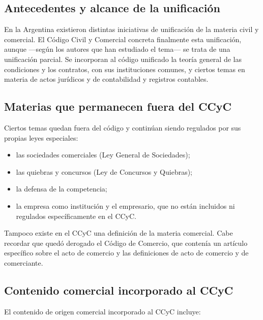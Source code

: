\documentclass[12pt,oneside]{book}
\begin{document}
\subsection{Antecedentes y alcance de la unificación}

En la Argentina existieron distintas iniciativas de unificación de la materia civil y comercial. El Código Civil y Comercial concreta finalmente esta unificación, aunque —según los autores que han estudiado el tema— se trata de una unificación parcial. Se incorporan al código unificado la teoría general de las condiciones y los contratos, con sus instituciones comunes, y ciertos temas en materia de actos jurídicos y de contabilidad y registros contables.

\subsection{Materias que permanecen fuera del CCyC}

Ciertos temas quedan fuera del código y continúan siendo regulados por sus propias leyes especiales:

\begin{itemize}
    \item las sociedades comerciales (Ley General de Sociedades);
    \item las quiebras y concursos (Ley de Concursos y Quiebras);
    \item la defensa de la competencia;
    \item la empresa como institución y el empresario, que no están incluidos ni regulados específicamente en el CCyC.
\end{itemize}

Tampoco existe en el CCyC una definición de la materia comercial. Cabe recordar que quedó derogado el Código de Comercio, que contenía un artículo específico sobre el acto de comercio y las definiciones de acto de comercio y de comerciante.

\subsection{Contenido comercial incorporado al CCyC}

El contenido de origen comercial incorporado al CCyC incluye:
\end{document}
